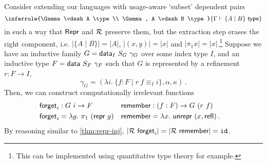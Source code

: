 Consider extending our languages with usage-aware `subset' dependent pairs
\[
\inferrule{\Gamma \vdash A \type \\ \Gamma, A \vdash B \type}{\Gamma \vdash \{A \mid B\} \type}
\]
in such a way that $\textsf{Repr}$ and $\mathcal{R}$ preserve them, but the extraction step
erases the right component, i.e. $|\{A \mid B\}| = |A|$, $|(x, y)| = |x|$ and
$|\pi_1 x| = |x|$.\footnote{This can be implemented using quantitative type
theory for example.} Suppose we have an inductive family $G = \textsf{data}_I\ S_G\
\gamma_G$ over some index type $I$, and an inductive type $F = \textsf{data}\ S_F\
\gamma_F$ such that $G$ is represented by a refinement $r : F \to I$,
\[
    \gamma_G = (\lambda i.\ \{ f : F \mid r\ f \equiv_I i \}, \alpha, \kappa) \,.
\]
Then, we can construct computationally irrelevant functions
\begin{align*}
&\begin{aligned}
&\textsf{forget}_i : G\ i \to F \\
&\textsf{forget}_i = \lambda g.\ \pi_1\ (\textsf{repr}\ g)
\end{aligned} \quad \begin{aligned}
&\textsf{remember} : (f : F) \to G\ (r\ f) \\
&\textsf{remember} = \lambda x.\ \textsf{unrepr}\ (x, \textsf{refl}) \,.
\end{aligned}
\end{align*}
By reasoning similar to \cref{thm:repr-inj}, $|\mathcal{R}\ \textsf{forget}_i| = |\mathcal{R}\
\textsf{remember}| = \texttt{id}$.

